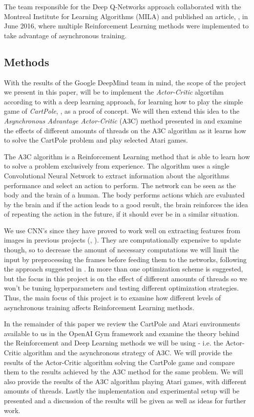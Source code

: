 \documentclass[11pt]{article}
\begin{document}
The team responsible for the Deep Q-Networks approach collaborated with
the Montreal Institute for Learning Algorithms (MILA) and published
an article, \cite{a3c}, in June 2016, where multiple Reinforcement Learning methods were implemented to
take advantage of asynchronous training.

\subsection{Methods}

With the results of the Google DeepMind team in mind, the scope of the project we present in
this paper, will be to implement the \textit{Actor-Critic} algortihm according to \cite{RLbook}
with a deep learning approach, for learning how to play the simple game of \textit{CartPole}, \cite{cart_pole},
as a proof of concept.
We will then extend this idea to the \textit{Asynchronous Advantage Actor-Critic} (A3C)
method presented in \cite{a3c} and examine the effects of different amounts of threads
on the A3C algorithm as it learns how to solve the CartPole problem and play selected Atari games.

The A3C algorithm is a Reinforcement Learning method that is able to learn
how to solve a problem exclusively from experience.
The algorithm uses a single Convolutional Neural Network to extract information
about the algorithms performance and select an action to perform.
The network can be seen as the body and the brain of a human.
The body performs actions which are evaluated by the brain and if
the action leads to a good result, the brain reinforces the idea
of repeating the action in the future, if it should ever be in a similar
situation.

We use CNN's since they have proved to work well on extracting features
from images in previous projects (\cite{dqn}, \cite{a3c}).
They are computationally expensive to update though,
so to decrease the amount of necessary computations we will limit
the input by preprocessing the frames before feeding them
to the networks, following the approach suggested in \cite{dqn-nature}.
In \cite{a3c} more than one optimization scheme
is suggested, but the focus in this project is on the effect of
different amounts of threads so we won't be tuning hyperparameters
and testing different optimization strategies.
Thus, the main focus of this project is to examine how different levels of asynchronous
training affects Reinforcement Learning methods.

In the remainder of this paper we review the 
CartPole and Atari environments available to us in
the OpenAI Gym framework and examine the theory behind the
Reinforcement and Deep Learning methods we will be using
- i.e. the Actor-Critic algorithm and the asynchronous strategy of A3C.
We will provide the results of the Actor-Critic algorithm
solving the CartPole game and compare them to the results achieved by the A3C method
for the same problem.
We will also provide the results of the A3C algorithm playing Atari games, with different 
amounts of threads. 
Lastly the implementation and experimental setup will be presented and
a discussion of the results will be given as well as ideas for further
work.
\end{document}
